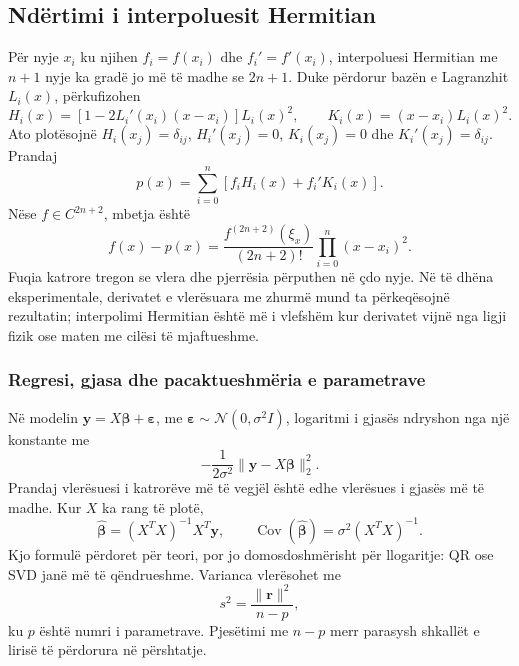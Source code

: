 \documentclass[11pt,oneside,openany]{book}
\newcommand{\vect}[1]{\bm{#1}}
\newcommand{\Cov}{\operatorname{Cov}}
\begin{document}
\subsection{Ndërtimi i interpoluesit Hermitian}
Për nyje $x_i$ ku njihen $f_i=f(x_i)$ dhe $f_i'=f'(x_i)$, interpoluesi Hermitian me $n+1$ nyje ka gradë jo më të madhe se $2n+1$. Duke përdorur bazën e Lagranzhit $L_i(x)$, përkufizohen
\begin{equation}
 H_i(x)=\left[1-2L_i'(x_i)(x-x_i)\right]L_i(x)^2,
 \qquad
 K_i(x)=(x-x_i)L_i(x)^2.
\end{equation}
Ato plotësojnë $H_i(x_j)=\delta_{ij}$, $H_i'(x_j)=0$, $K_i(x_j)=0$ dhe $K_i'(x_j)=\delta_{ij}$. Prandaj
\begin{equation}
 p(x)=\sum_{i=0}^{n}\left[f_iH_i(x)+f_i'K_i(x)\right].
\end{equation}
Nëse $f\in C^{2n+2}$, mbetja është
\begin{equation}
 f(x)-p(x)=\frac{f^{(2n+2)}(\xi_x)}{(2n+2)!}
 \prod_{i=0}^{n}(x-x_i)^2.
\end{equation}
Fuqia katrore tregon se vlera dhe pjerrësia përputhen në çdo nyje. Në të dhëna eksperimentale, derivatet e vlerësuara me zhurmë mund ta përkeqësojnë rezultatin; interpolimi Hermitian është më i vlefshëm kur derivatet vijnë nga ligji fizik ose maten me cilësi të mjaftueshme.

\subsubsection{Regresi, gjasa dhe pacaktueshmëria e parametrave}
Në modelin $\vect y=X\vect\beta+\vect\varepsilon$, me $\vect\varepsilon\sim\mathcal N(0,\sigma^2I)$, logaritmi i gjasës ndryshon nga një konstante me
\begin{equation}
 -\frac{1}{2\sigma^2}\|\vect y-X\vect\beta\|_2^2.
\end{equation}
Prandaj vlerësuesi i katrorëve më të vegjël është edhe vlerësues i gjasës më të madhe. Kur $X$ ka rang të plotë,
\begin{equation}
 \widehat{\vect\beta}=(X^TX)^{-1}X^T\vect y,
 \qquad
 \Cov(\widehat{\vect\beta})=\sigma^2(X^TX)^{-1}.
\end{equation}
Kjo formulë përdoret për teori, por jo domosdoshmërisht për llogaritje: QR ose SVD janë më të qëndrueshme. Varianca vlerësohet me
\begin{equation}
 s^2=\frac{\|\vect r\|^2}{n-p},
\end{equation}
ku $p$ është numri i parametrave. Pjesëtimi me $n-p$ merr parasysh shkallët e lirisë të përdorura në përshtatje.
\end{document}
